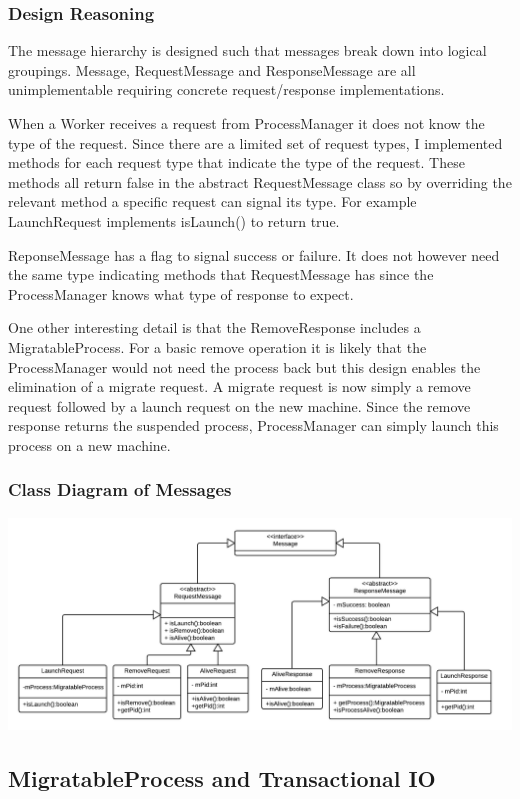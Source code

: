 \documentclass[12pt]{article}
\begin{document}
\subsubsection{Design Reasoning}
The message hierarchy is designed such that messages break down into logical groupings. Message, RequestMessage and ResponseMessage are all unimplementable requiring concrete request/response implementations.

When a Worker receives a request from ProcessManager it does not know the type of the request. Since there are a limited set of request types, I implemented methods for each request type that indicate the type of the request. These methods all return false in the abstract RequestMessage class so by overriding the relevant method a specific request can signal its type. For example LaunchRequest implements isLaunch() to return true.

ReponseMessage has a flag to signal success or failure. It does not however need the same type indicating methods that RequestMessage has since the ProcessManager knows what type of response to expect.

One other interesting detail is that the RemoveResponse includes a MigratableProcess. For a basic remove operation it is likely that the ProcessManager would not need the process back but this design enables the elimination of a migrate request. A migrate request is now simply a remove request followed by a launch request on the new machine. Since the remove response returns the suspended process, ProcessManager  can simply launch this process on a new machine.

\subsubsection{Class Diagram of Messages}
\includegraphics[scale=.3]{messages.png}

\subsection{MigratableProcess and Transactional IO}
\end{document}
